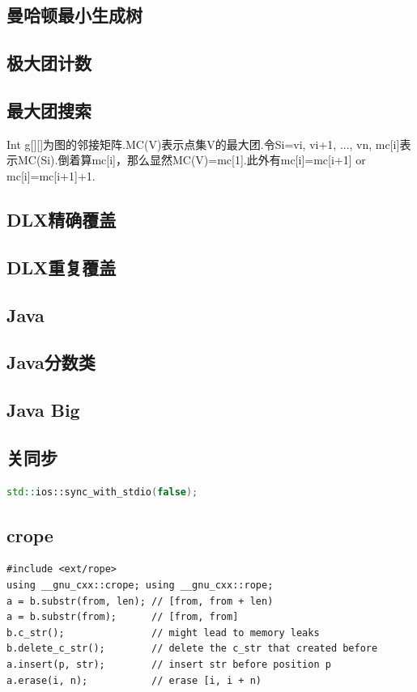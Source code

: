 \documentclass[landscape,a4paper]{article}
\begin{document}
\begin{spacing}{0.3}
\begin{multicols}{2}
	\subsection{曼哈顿最小生成树}
	
	\subsection{极大团计数}
	
	\subsection{最大团搜索}
	Int g[][]为图的邻接矩阵.MC(V)表示点集V的最大团.令Si={vi, vi+1, ..., vn}, mc[i]表示MC(Si).倒着算mc[i]，那么显然MC(V)=mc[1].此外有mc[i]=mc[i+1] or mc[i]=mc[i+1]+1.
	
	\subsection{DLX精确覆盖}
	
	\subsection{DLX重复覆盖}
	
	\subsection{Java}
	
	\subsection{Java分数类}
	
	\subsection{Java Big}
	
\subsection{关同步}
\begin{lstlisting}[language=C++]
    std::ios::sync_with_stdio(false);
\end{lstlisting}
	\subsection{crope}
	\begin{lstlisting}
#include <ext/rope>
using __gnu_cxx::crope; using __gnu_cxx::rope;
a = b.substr(from, len); // [from, from + len)
a = b.substr(from);      // [from, from]
b.c_str();               // might lead to memory leaks
b.delete_c_str();        // delete the c_str that created before
a.insert(p, str);        // insert str before position p
a.erase(i, n);           // erase [i, i + n)


\end{lstlisting}
\end{multicols}
\end{spacing}
\end{document}
